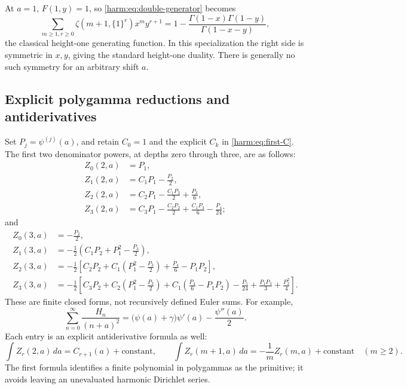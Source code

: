 At $a=1$, $F(1,y)=1$, so \eqref{harm:eq:double-generator} becomes
\[
 \sum_{m\ge1,r\ge0}\zeta(m+1,\{1\}^r)x^m y^{r+1}
 =1-\frac{\Gamma(1-x)\Gamma(1-y)}{\Gamma(1-x-y)},
\]
the classical height-one generating function.  In this specialization
the right side is symmetric in $x,y$, giving the standard height-one
duality.  There is generally no such symmetry for an arbitrary shift $a$.

\subsection{Explicit polygamma reductions and antiderivatives}

Set $P_j=\psi^{(j)}(a)$, and retain $C_0=1$ and the explicit $C_k$ in
\eqref{harm:eq:first-C}.  The first two denominator powers, at depths
zero through three, are as follows:
\begin{align}
 Z_0(2,a)&=P_1,\\
 Z_1(2,a)&=C_1P_1-\frac{P_2}{2},\\
 Z_2(2,a)&=C_2P_1-\frac{C_1P_2}{2}+\frac{P_3}{6},\\
 Z_3(2,a)&=C_3P_1-\frac{C_2P_2}{2}
                    +\frac{C_1P_3}{6}-\frac{P_4}{24};
 \label{harm:eq:square-table}
\end{align}
and
\begin{align}
 Z_0(3,a)&=-\frac{P_2}{2},\\
 Z_1(3,a)&=-\frac12\left(C_1P_2+P_1^2-\frac{P_3}{2}\right),\\
 Z_2(3,a)&=-\frac12\left[
 C_2P_2+C_1\left(P_1^2-\frac{P_3}{2}\right)
       +\frac{P_4}{6}-P_1P_2\right],\\
 Z_3(3,a)&=-\frac12\left[
 C_3P_2+C_2\left(P_1^2-\frac{P_3}{2}\right)
 +C_1\left(\frac{P_4}{6}-P_1P_2\right)
 -\frac{P_5}{24}+\frac{P_1P_3}{3}+\frac{P_2^2}{4}\right].
 \label{harm:eq:cube-table}
\end{align}
These are finite closed forms, not recursively defined Euler sums.
For example,
\begin{equation}\label{harm:eq:linear-example}
 \sum_{n=0}^{\infty}\frac{H_n}{(n+a)^2}
 =\bigl(\psi(a)+\gamma\bigr)\psi'(a)-\frac{\psi''(a)}2.
\end{equation}
Each entry is an explicit antiderivative formula as well:
\begin{equation}\label{harm:eq:antiderivative}
 \int Z_r(2,a)\,da=C_{r+1}(a)+\mathrm{constant},\qquad
 \int Z_r(m+1,a)\,da=-\frac1mZ_r(m,a)+\mathrm{constant}
 \quad(m\ge2).
\end{equation}
The first formula identifies a finite polynomial in polygammas as the
primitive; it avoids leaving an unevaluated harmonic Dirichlet series.

